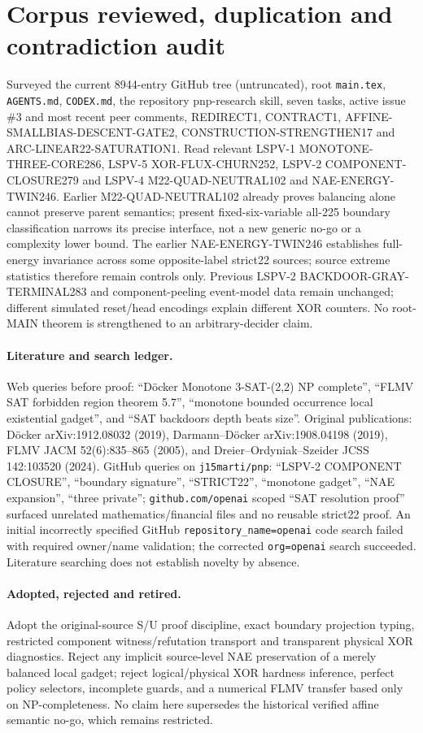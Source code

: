 \documentclass[11pt]{article}
\begin{document}
\section{Corpus reviewed, duplication and contradiction audit}
Surveyed the current 8944-entry GitHub tree (untruncated), root \texttt{main.tex}, \texttt{AGENTS.md}, \texttt{CODEX.md}, the repository pnp-research skill, seven tasks, active issue \#3 and most recent peer comments, REDIRECT1, CONTRACT1, AFFINE-SMALLBIAS-DESCENT-GATE2, CONSTRUCTION-STRENGTHEN17 and ARC-LINEAR22-SATURATION1. Read relevant LSPV-1 MONOTONE-THREE-CORE286, LSPV-5 XOR-FLUX-CHURN252, LSPV-2 COMPONENT-CLOSURE279 and LSPV-4 M22-QUAD-NEUTRAL102 and NAE-ENERGY-TWIN246. Earlier M22-QUAD-NEUTRAL102 already proves balancing alone cannot preserve parent semantics; present fixed-six-variable all-225 boundary classification narrows its precise interface, not a new generic no-go or a complexity lower bound. The earlier NAE-ENERGY-TWIN246 establishes full-energy invariance across some opposite-label strict22 sources; source extreme statistics therefore remain controls only. Previous LSPV-2 BACKDOOR-GRAY-TERMINAL283 and component-peeling event-model data remain unchanged; different simulated reset/head encodings explain different XOR counters. No root-MAIN theorem is strengthened to an arbitrary-decider claim.
\paragraph{Literature and search ledger.} Web queries before proof: ``D\"ocker Monotone 3-SAT-(2,2) NP complete'', ``FLMV SAT forbidden region theorem 5.7'', ``monotone bounded occurrence local existential gadget'', and ``SAT backdoors depth beats size''. Original publications: D\"ocker arXiv:1912.08032 (2019), Darmann--D\"ocker arXiv:1908.04198 (2019), FLMV JACM 52(6):835--865 (2005), and Dreier--Ordyniak--Szeider JCSS 142:103520 (2024). GitHub queries on \texttt{j15marti/pnp}: ``LSPV-2 COMPONENT CLOSURE'', ``boundary signature'', ``STRICT22'', ``monotone gadget'', ``NAE expansion'', ``three private''; \texttt{github.com/openai} scoped ``SAT resolution proof'' surfaced unrelated mathematics/financial files and no reusable strict22 proof. An initial incorrectly specified GitHub \texttt{repository\_name=openai} code search failed with required owner/name validation; the corrected \texttt{org=openai} search succeeded. Literature searching does not establish novelty by absence.
\paragraph{Adopted, rejected and retired.} Adopt the original-source S/U proof discipline, exact boundary projection typing, restricted component witness/refutation transport and transparent physical XOR diagnostics. Reject any implicit source-level NAE preservation of a merely balanced local gadget; reject logical/physical XOR hardness inference, perfect policy selectors, incomplete guards, and a numerical FLMV transfer based only on NP-completeness. No claim here supersedes the historical verified affine semantic no-go, which remains restricted.
\end{document}
